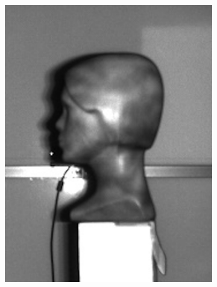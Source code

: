 \begin{figure}[h]
	\centering
	\begin{subfigure}[b]{0.2\textwidth}
		\centering
		\includegraphics[width=\textwidth]{figures/depth_ir-a.png}
		\caption{}
		\label{fig:depthir:a}
	\end{subfigure}
	\hfill
	\begin{subfigure}[b]{0.2\textwidth}
		\centering

\end{subfigure}
\end{figure}
